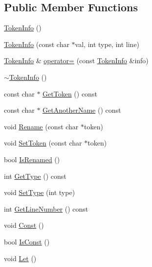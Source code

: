 \subsection*{Public Member Functions}
\begin{DoxyCompactItemize}
\item 
\hyperlink{classmocha_1_1_token_info_a2c5574dee34a4ba209ca1b976a1b51d0}{TokenInfo} ()
\item 
\hyperlink{classmocha_1_1_token_info_abd126072703b4742ba725a3f9d2eb4d7}{TokenInfo} (const char $\ast$val, int type, int line)
\item 
\hyperlink{classmocha_1_1_token_info}{TokenInfo} \& \hyperlink{classmocha_1_1_token_info_a9b0216ae0aec1dfd277021f6f7266d95}{operator=} (const \hyperlink{classmocha_1_1_token_info}{TokenInfo} \&info)
\item 
\hyperlink{classmocha_1_1_token_info_a6c25757706b1230557daec10f30c5485}{$\sim$TokenInfo} ()
\item 
const char $\ast$ \hyperlink{classmocha_1_1_token_info_acdba6b43e70add98383ba963934cf32a}{GetToken} () const 
\item 
const char $\ast$ \hyperlink{classmocha_1_1_token_info_af436e9d263a4b08206afe6d7c79750a2}{GetAnotherName} () const 
\item 
void \hyperlink{classmocha_1_1_token_info_aceff81872d7d028051ff3c47be4e0a00}{Rename} (const char $\ast$token)
\item 
void \hyperlink{classmocha_1_1_token_info_a179e84bdeff2a02ca2931fff34010ad1}{SetToken} (const char $\ast$token)
\item 
bool \hyperlink{classmocha_1_1_token_info_ae9671e344d142a4cb83198329cdfcb17}{IsRenamed} ()
\item 
int \hyperlink{classmocha_1_1_token_info_a36fc04622e34f258f4a638a1af20858b}{GetType} () const 
\item 
void \hyperlink{classmocha_1_1_token_info_ada96af218e6a284d0c0217da4c964348}{SetType} (int type)
\item 
int \hyperlink{classmocha_1_1_token_info_a49e74ec7812e0f83c5831af40f2372fa}{GetLineNumber} () const 
\item 
void \hyperlink{classmocha_1_1_token_info_ae634d32d671e53e049a4fe5928efbd99}{Const} ()
\item 
bool \hyperlink{classmocha_1_1_token_info_ad98cf90cfefc45744b36341a787650bb}{IsConst} ()
\item 
void \hyperlink{classmocha_1_1_token_info_a007d63fcfa141f6939975233fea899fa}{Let} ()
\item 

\end{DoxyCompactItemize}
